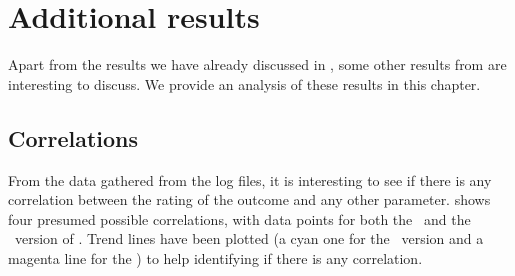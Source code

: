 \chapter{Additional results}

Apart from the results we have already discussed in , some other results from  are interesting to discuss. We provide an analysis of these results in this chapter.



\section{Correlations}
From the data gathered from the log files, it is interesting to see if there is any correlation between the rating of the outcome and any other parameter.  shows four presumed possible correlations, with data points for both the \IDa\ and the \IDb\ version of \oframp. Trend lines have been plotted (a cyan one for the \IDa\ version and a magenta line for the \IDb) to help identifying if there is any correlation.

